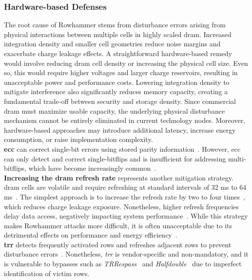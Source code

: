         \subsubsection{Hardware-based Defenses} \label{subsubsec:hardware-based-defenses}
            The root cause of Rowhammer stems from disturbance errors arising from physical interactions between multiple 
            cells in highly scaled \gls{dram}. Increased integration density and smaller cell geometries reduce noise margins 
            and exacerbate charge leakage effects. A straightforward hardware-based remedy would involve reducing \gls{dram} 
            cell density or increasing the physical cell size. Even so, this would require higher voltages and larger 
            charge reservoirs, resulting in unacceptable power and performance costs. Lowering integration density to 
            mitigate interference also significantly reduces memory capacity, creating a fundamental trade-off between 
            security and storage density. Since commercial \gls{dram} must maximize usable capacity, the underlying physical 
            disturbance mechanism cannot be entirely eliminated in current technology nodes. Moreover, hardware-based 
            approaches may introduce additional latency, increase energy consumption, or raise implementation complexity.
            \\
            \textbf{\gls{ecc}} can correct single-bit errors using stored parity information~\cite{paperRHARetrospective, webTenYearsOfRH, paperECC}. However, 
            \gls{ecc} can only detect and correct single-bitflips and is insufficient for addressing multi-bitflips, which 
            have become increasingly common~\cite{paperTriggeringRHHardwareFault}.
            \\
            \textbf{Increasing the \gls{dram} refresh rate} represents another mitigation strategy. \gls{dram} cells are volatile and 
            require refreshing at standard intervals of 32 ms to 64 ms~\cite{paperTriggeringRHHardwareFault}. The simplest approach is to increase 
            the refresh rate by two to four times~\cite{paperRHARetrospective, webTenYearsOfRH}, which reduces charge leakage exposure. Nonetheless, higher refresh 
            frequencies delay data access, negatively impacting system performance~\cite{webTenYearsOfRH}. While this strategy makes Rowhammer 
            attacks more difficult, it is often unacceptable due to its detrimental effects on performance and energy efficiency~\cite{paperTriggeringRHHardwareFault}.
            \\
            \textbf{\gls{trr}} detects frequently activated rows and refreshes adjacent rows to prevent 
            disturbance errors~\cite{paperTRRScope, paperTRRespass}. Nonetheless, \textit{\gls{trr}} is vendor-specific and non-mandatory, and it is vulnerable to bypasses such 
            as \textit{TRRespass}~\cite{paperTRRespass,toolTRRespass} and \textit{Halfdouble}~\cite{paperHalfDouble,toolHalfDouble} due to imperfect identification of victim rows.
        
